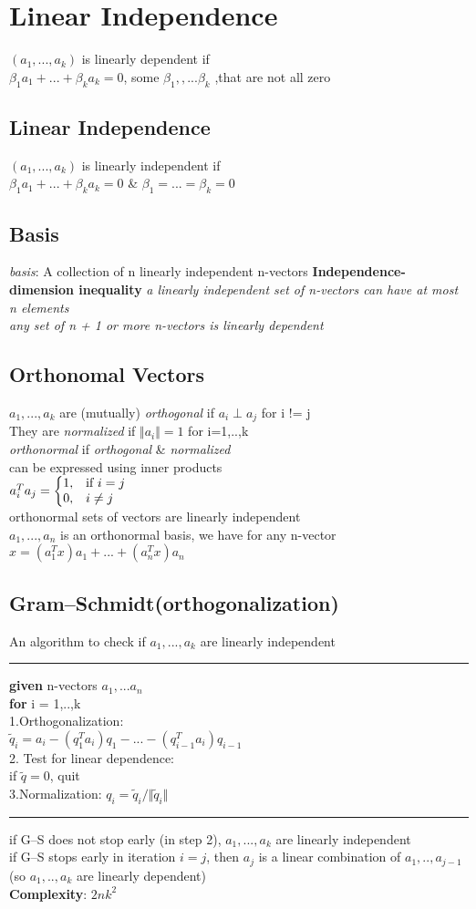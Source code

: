 \section{Linear Independence}
$(a_1,...,a_k)$ is linearly dependent if\\
$\beta_1 a_1+...+\beta_k a_k = 0$, some $\beta_1,,...\beta_k$ ,that are not all zero
\subsection{Linear Independence}
$(a_1,...,a_k)$ is linearly independent if\\
$\beta_1 a_1+...+\beta_k a_k = 0$ \& $\beta_1 =...= \beta_k =0$
\subsection{Basis}
\textit{basis}: A collection of n linearly independent n-vectors
\textbf{Independence-dimension inequality}
\textit{a linearly independent set of n-vectors can have at most n elements}\\
\textit{any set of n + 1 or more n-vectors is linearly dependent}

\subsection{Orthonomal Vectors}
$a_1,...,a_k$ are (mutually) \textit{orthogonal} if $a_i \perp a_j$ for i != j\\
They are \textit{normalized} if $\Vert a_i\Vert = 1$ for i=1,..,k\\
\textbullet \textit{orthonormal} if \textit{orthogonal} \& \textit{normalized}\\
\textbullet can be expressed using inner products\\
$
a_i^Ta_j = \left\{
  \begin{array}{@{}ll@{}}
    1, & \text{if}\ i=j \\
    0, & i \neq j
  \end{array}\right.
$\\
\textbullet orthonormal sets of vectors are linearly independent\\
\textbullet $a_1,. . . ,a_n$ is an orthonormal basis, we have for any n-vector $x = ( a^T_1 x ) a_1 +...+ ( a^T_n x ) a_n$
\subsection{Gram–Schmidt(orthogonalization)}
An algorithm to check if $a_1,...,a_k$ are linearly independent\\
\rule{\linewidth}{0.4pt}
\textbf{given} n-vectors $a_1,...a_n$\\
\textbf{for} i = 1,..,k\\
1.Orthogonalization: \\$\tilde{q}_i = a_i - (q^T_1 a_i)q_1 - ... - (q^T_{i-1}a_i)q_{i-1}$\\
2. Test for linear dependence: \\if $\tilde{q} = 0$, quit\\
3.Normalization: $q_i = \tilde{q}_i/\Vert \tilde{q}_i\Vert$\\
\rule{\linewidth}{0.4pt}

\textbullet if G–S does not stop early (in step 2), $a_1 , . . . , a_k$ are linearly independent\\
\textbullet if G–S stops early in iteration $i = j$, then $a_j$ is a linear combination of $a_1,..,a_{j-1}$ (so $a_1,..,a_k$ are linearly dependent)\\
\textbf{Complexity}: $2nk^2$
